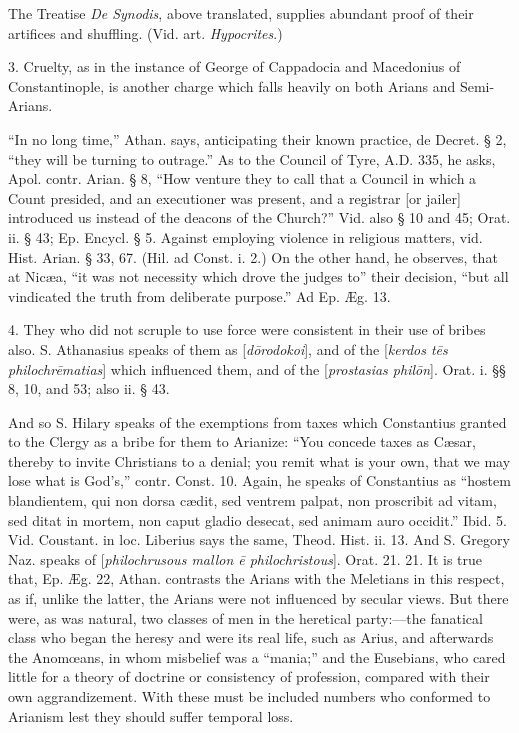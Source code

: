The Treatise \emph{De Synodis}, above translated,
supplies abundant proof of their artifices and shuffling. (Vid.
art. \emph{Hypocrites}.)

3. Cruelty, as in the instance of George of
Cappadocia and Macedonius of Constantinople, is another charge which
falls heavily on both Arians and Semi-Arians.

``In no long time,'' Athan. says, anticipating
their known practice, de Decret. § 2, ``they will be turning to
outrage.'' As to the Council of Tyre, A.D.
335, he asks, Apol. contr. Arian. § 8, ``How venture they to call that
a Council in which a Count presided, and an executioner was present,
and a registrar [or jailer] introduced us instead of the deacons of
the Church?'' Vid. also § 10 and 45; Orat. ii. § 43; Ep. Encycl. §
5. Against employing violence in religious matters, vid. Hist. Arian.
§ 33, 67. (Hil. ad Const. i. 2.) On the other hand, he observes, that
at Nicæa, ``it was not necessity which drove the judges to'' their
decision, ``but all vindicated the truth from deliberate purpose.''
Ad Ep. Æg. 13.

4. They who did not scruple to use force were
consistent in their use of bribes also. S. Athanasius speaks of them
as [\emph{d\={o}rodokoi}], and of the [\emph{kerdos t\={e}s
philochr\={e}matias}] which influenced them, and of the [\emph{prostasias
phil\={o}n}]. Orat. i. §§ 8, 10, and 53; also ii. § 43.

And so S. Hilary speaks of the exemptions from
taxes which Constantius granted to the Clergy as a bribe for them to
Arianize: ``You concede taxes as Cæsar, thereby to invite Christians
to a denial; you remit what is your own, that we may lose what is God's,''
contr. Const. 10. Again, he speaks of Constantius as ``hostem
blandientem, qui non dorsa cædit, sed ventrem palpat, non proscribit
ad vitam, sed ditat in mortem, non caput gladio desecat, sed animam
auro occidit.'' Ibid. 5. Vid. Coustant. in loc. Liberius says the same,
Theod. Hist. ii. 13. And S. Gregory Naz. speaks of [\emph{philochrusous
mallon \={e} philochristous}]. Orat. 21. 21. It is true that, Ep.
Æg. 22, Athan. contrasts the Arians with the Meletians in this
respect, as if, unlike the latter, the Arians were not influenced by
secular views. But there were, as was natural, two classes of men in
the heretical party:—the fanatical class who began the heresy and
were its real life, such as Arius, and afterwards the Anomœans, in
whom misbelief was a ``mania;'' and the Eusebians, who cared little for
a theory of doctrine or consistency of profession, compared with their
own aggrandizement. With these must be included numbers who conformed
to Arianism lest they should suffer temporal loss.

